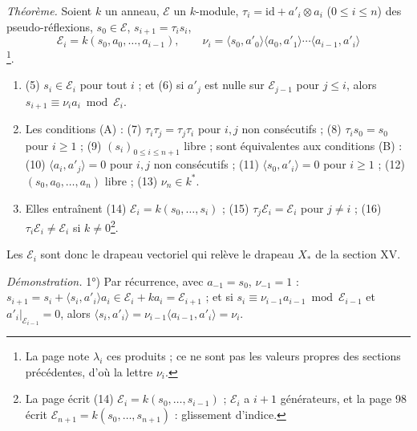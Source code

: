 \documentclass[11pt,a4paper]{article}
\begin{document}
\emph{Théorème.} Soient $k$ un anneau, $\mathcal{E}$ un $k$-module, $\tau_i =
\mathrm{id} + a'_i \otimes a_i$ ($0 \leqslant i \leqslant n$) des
pseudo-réflexions, $s_0 \in \mathcal{E}$, $s_{i+1} = \tau_i s_i$,
\[
\mathcal{E}_i = k(s_0, a_0, \ldots, a_{i-1}), \qquad \nu_i = \langle s_0, a'_0
\rangle \langle a_0, a'_1 \rangle \cdots \langle a_{i-1}, a'_i \rangle
\]
\footnote{La page note $\lambda_i$ ces produits ; ce ne sont pas les valeurs
propres des sections précédentes, d'où la lettre $\nu_i$.}.
\begin{enumerate}
  \item[1°)] (5) $s_i \in \mathcal{E}_i$ pour tout $i$ ; et (6) si $a'_j$ est nulle
    sur $\mathcal{E}_{j-1}$ pour $j \leqslant i$, alors $s_{i+1} \equiv \nu_i
    a_i \bmod \mathcal{E}_i$.
  \item[2°)] Les conditions (A) : (7) $\tau_i\tau_j = \tau_j\tau_i$ pour $i, j$ non
    consécutifs ; (8) $\tau_i s_0 = s_0$ pour $i \geqslant 1$ ; (9) $(s_i)_{0
    \leqslant i \leqslant n+1}$ libre ; sont équivalentes aux conditions (B) :
    (10) $\langle a_i, a'_j \rangle = 0$ pour $i, j$ non consécutifs ; (11)
    $\langle s_0, a'_i \rangle = 0$ pour $i \geqslant 1$ ; (12) $(s_0, a_0,
    \ldots, a_n)$ libre ; (13) $\nu_n \in k^*$.
  \item[3°)] Elles entraînent (14) $\mathcal{E}_i = k(s_0, \ldots, s_i)$ ; (15)
    $\tau_j \mathcal{E}_i = \mathcal{E}_i$ pour $j \neq i$ ; (16) $\tau_i
    \mathcal{E}_i \neq \mathcal{E}_i$ si $k \neq 0$\footnote{La page écrit (14)
    $\mathcal{E}_i = k(s_0, \ldots, s_{i-1})$ ; $\mathcal{E}_i$ a $i+1$
    générateurs, et la page 98 écrit $\mathcal{E}_{n+1} = k(s_0, \ldots,
    s_{n+1})$ : glissement d'indice.}.
\end{enumerate}
Les $\mathcal{E}_i$ sont donc le drapeau vectoriel qui relève le drapeau $X_*$ de
la section XV.

\emph{Démonstration.} 1°) Par récurrence, avec $a_{-1} = s_0$, $\nu_{-1} = 1$ :
$s_{i+1} = s_i + \langle s_i, a'_i \rangle a_i \in \mathcal{E}_i + ka_i =
\mathcal{E}_{i+1}$ ; et si $s_i \equiv \nu_{i-1} a_{i-1} \bmod \mathcal{E}_{i-1}$
et $a'_i|_{\mathcal{E}_{i-1}} = 0$, alors $\langle s_i, a'_i \rangle =
\nu_{i-1}\langle a_{i-1}, a'_i \rangle = \nu_i$.
\end{document}
